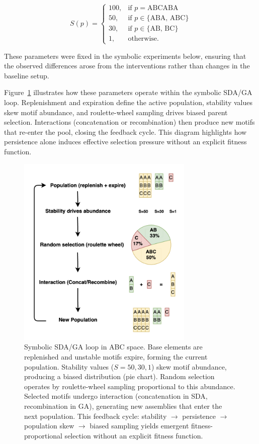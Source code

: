 \documentclass[life,article,submit,pdftex,moreauthors]{Definitions/mdpi}
\begin{document}
\begin{equation}
S(p) =
\begin{cases}
100, & \text{if } p = \text{ABCABA} \\
50, & \text{if } p \in \{\text{ABA, ABC}\} \\
30, & \text{if } p \in \{\text{AB, BC}\} \\
1, & \text{otherwise}.
\end{cases}
\end{equation}

These parameters were fixed in the symbolic experiments below, ensuring that the observed differences arose from the interventions rather than changes in
the baseline setup.

Figure~\ref{fig:sda-loop} illustrates how these parameters operate within the
symbolic SDA/GA loop. Replenishment and expiration define the active population, 
stability values skew motif abundance, and roulette-wheel sampling drives
biased parent selection. Interactions (concatenation or recombination) then
produce new motifs that re-enter the pool, closing the feedback cycle. 
This diagram highlights how persistence alone induces effective selection
pressure without an explicit fitness function.


\begin{figure}[H]
    \centering
    \includegraphics[width=0.75\textwidth]{SDA-Sym.png}
    \caption{Symbolic SDA/GA loop in ABC space. 
    Base elements are replenished and unstable motifs expire, forming the current population. 
    Stability values ($S=50,30,1$) skew motif abundance, producing a biased distribution (pie chart). 
    Random selection operates by roulette-wheel sampling proportional to this abundance. 
    Selected motifs undergo interaction (concatenation in SDA, recombination in GA), 
    generating new assemblies that enter the next population. 
    This feedback cycle: stability $\to$ persistence $\to$ population skew $\to$ biased sampling yields emergent fitness-proportional selection without an explicit fitness function.}
    \label{fig:sda-loop}
\end{figure}
\end{document}
